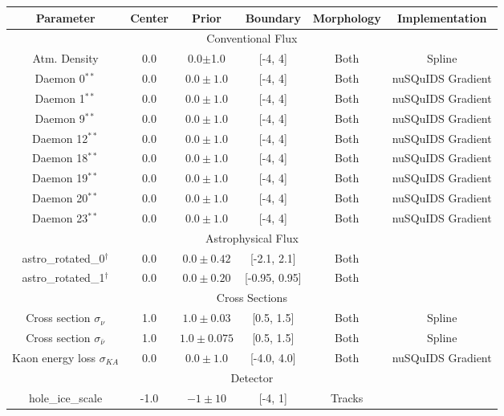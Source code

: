 \documentclass[main.tex]{subfiles}
\begin{document}
\begin{table}
    \centering
    \begin{tabular}{c | ccccc}\rowcolor{blue!25}
        {\large \textbf{Parameter}} & {\large \textbf{Center}} & {\large \textbf{Prior}} & {\large \textbf{Boundary}}& {\large \textbf{Morphology}} & {\large \textbf{Implementation}}\\ \hline
        \multicolumn{6}{c}{Conventional Flux} \\\hline
        Atm. Density & 0.0 & 0.0$\pm$1.0 & [-4, 4] & Both &  Spline\\
        Daemon 0$^{**}$  & 0.0 & $0.0\pm1.0$ & [-4, 4]& Both & nuSQuIDS Gradient \\
        Daemon 1$^{**}$  & 0.0 & $0.0\pm1.0$ & [-4, 4]& Both & nuSQuIDS Gradient \\
        Daemon 9$^{**}$  & 0.0 & $0.0\pm1.0$ & [-4, 4]& Both & nuSQuIDS Gradient \\
        Daemon 12$^{**}$  & 0.0 & $0.0\pm1.0$ & [-4, 4]& Both & nuSQuIDS Gradient \\
        Daemon 18$^{**}$  & 0.0 & $0.0\pm1.0$ & [-4, 4]& Both & nuSQuIDS Gradient \\
        Daemon 19$^{**}$  & 0.0 & $0.0\pm1.0$ & [-4, 4]& Both & nuSQuIDS Gradient \\
        Daemon 20$^{**}$  & 0.0 & $0.0\pm1.0$ & [-4, 4]& Both & nuSQuIDS Gradient \\
        Daemon 23$^{**}$  & 0.0 & $0.0\pm1.0$ & [-4, 4]& Both & nuSQuIDS Gradient \\
        \multicolumn{6}{c}{Astrophysical Flux} \\\hline
        astro\_rotated\_0$^{\dag}$ & 0.0 & $0.0\pm 0.42 $ & [-2.1, 2.1]&Both & \\
        astro\_rotated\_1$^{\dag}$ & 0.0 & $0.0\pm0.20$ & [-0.95, 0.95]&Both & \\
        \multicolumn{6}{c}{Cross Sections} \\\hline
        Cross section $\sigma_{\nu}$ & 1.0 & $1.0\pm0.03$ & [0.5, 1.5]& Both & Spline \\
        Cross section $\sigma_{\bar{\nu}}$ & 1.0 & $1.0\pm0.075$ & [0.5, 1.5]& Both & Spline \\
        Kaon energy loss $\sigma_{KA}$ & 0.0 & $0.0\pm1.0$ & [-4.0, 4.0]& Both &  nuSQuIDS Gradient\\
        \multicolumn{6}{c}{Detector} \\\hline 
        hole\_ice\_scale & -1.0 & $-1\pm10$ & [-4, 1]&Tracks & \\

\end{tabular}
\end{table}
\end{document}
